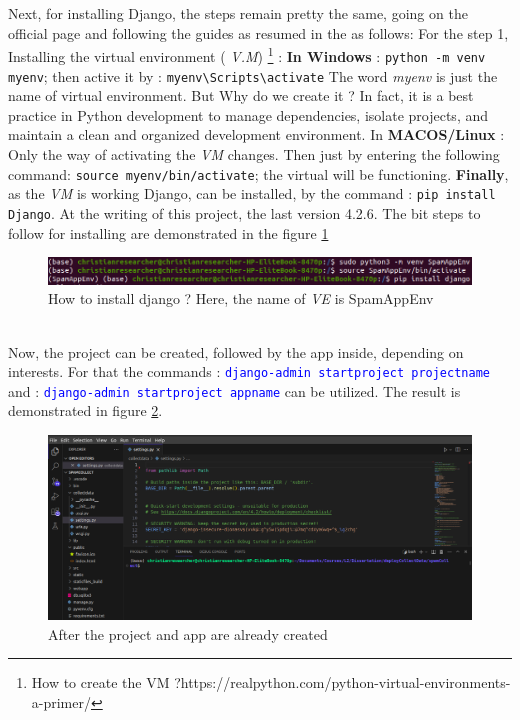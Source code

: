 \documentclass[12pt,a4paper]{report}
\begin{document}
   
   Next, for installing Django, the steps remain pretty the same, going on the official page and following the guides as resumed in the as follows:   
   For the step 1, Installing the virtual environment ( \textit{V.M}) \footnote{How to create the VM ?https://realpython.com/python-virtual-environments-a-primer/}    : \newline
   \textbf{In Windows} : \texttt{python -m venv myenv}; then active it by : \texttt{myenv\textbackslash Scripts\textbackslash activate} \newline
   The word \textit{myenv} is just the name of virtual environment. But Why do we create it ? In fact, it is a best practice in Python development to manage dependencies, isolate projects, and maintain a clean and organized development environment. \newline 
  In \textbf{MACOS/Linux} : Only the way of activating the \textit{VM} changes. Then just by entering the following command:\newline
  \texttt{source myenv/bin/activate}; the virtual will be functioning. 
  \newline
   \textbf{Finally}, as the \textit{VM} is working Django, can be installed, by the command :  \texttt{pip install Django}. At the writing of this project, the last version 4.2.6. The bit steps to follow for installing are demonstrated in the figure \ref{fig:installdjango}
\begin{figure}
	\centering
	\includegraphics[width=1\linewidth]{installDjango}
	\caption{How to install django ? Here, the name of \textit{VE} is SpamAppEnv}
	\label{fig:installdjango}
\end{figure}
\\
 Now, the project can be created, followed by the app inside, depending on interests. For that the commands  : \textcolor{blue}{ \texttt{django-admin startproject projectname}} and : \textcolor{blue}{\texttt{django-admin startproject appname}} can be utilized. The result is demonstrated in figure \ref{fig:visualstudio}. 
\begin{figure}
	\centering
	\includegraphics[width=1\linewidth]{visualStudio}
	\caption{After the project and app are already created}
	\label{fig:visualstudio}
\end{figure} 
\end{document}
